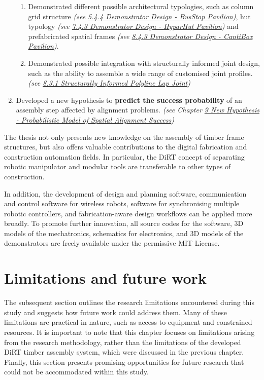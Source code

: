 \begin{enumerate}
\begin{enumerate}
		\item Demonstrated different possible architectural typologies, such as column grid structure \textit{(see \ul{5.4.4 Demonstrator Design - BusStop Pavilion})}, hut typology \textit{(see \ul{7.4.3 Demonstrator Design  - HyparHut Pavilion}) }and prefabricated spatial frames \textit{(see \ul{8.4.3 Demonstrator Design  - CantiBox Pavilion})}.

		\item Demonstrated possible integration with structurally informed joint design, such as the ability to assemble a wide range of customised joint profiles. \textit{(see \ul{8.3.1 Structurally Informed Polyline Lap Joint})}
	\end{enumerate}

	\item Developed a new hypothesis to \textbf{predict the success probability} of an assembly step affected by alignment problems. \textit{(see Chapter \ul{9 New Hypothesis - Probabilistic Model of Spatial Alignment Success})}

\end{enumerate}

The thesis not only presents new knowledge on the assembly of timber frame structures, but also offers valuable contributions to the digital fabrication and construction automation fields. In particular, the DiRT concept of separating robotic manipulator and modular tools are transferable to other types of construction. 

In addition, the development of design and planning software, communication and control software for wireless robots, software for synchronising multiple robotic controllers, and fabrication-aware design workflows can be applied more broadly. To promote further innovation, all source codes for the software, 3D models of the mechatronics, schematics for electronics, and 3D models of the demonstrators are freely available under the permissive MIT License. 

\section{Limitations and future work}
\label{section:limitations}

The subsequent section outlines the research limitations encountered during this study and suggests how future work could address them. Many of these limitations are practical in nature, such as access to equipment and constrained resources. It is important to note that this chapter focuses on limitations arising from the research methodology, rather than the limitations of the developed DiRT timber assembly system, which were discussed in the previous chapter. Finally, this section presents promising opportunities for future research that could not be accommodated within this study.

